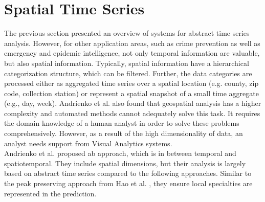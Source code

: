\documentclass[electronic]{vgtc}             %
\begin{document}
\section{Spatial Time Series\label{sec:spatiotemp}}
The previous section presented an overview of systems for abstract time series analysis. 
However, for other application areas, such as crime prevention as well as emergency and epidemic intelligence, not only temporal information are valuable, but also spatial information.
Typically, spatial information have a hierarchical categorization structure, which can be filtered.
Further, the data categories are processed either as aggregated time series over a spatial location (e.g. county, zip code, collection station) or represent a spatial snapshot of a small time aggregate (e.g., day, week).
Andrienko et al. \cite{Andrienko:2008, Andrienko:2010:Space} also found that geospatial analysis has a higher complexity and automated methods cannot adequately solve this task. 
It requires the domain knowledge of a human analyst in order to solve these problems comprehensively.
However, as a result of the high dimensionality of data, an analyst needs support from Visual Analytics systems.\\

Andrienko et al. \cite{Andrienko:2010} proposed ab approach, which is in between temporal and spatiotemporal. 
They include spatial dimensions, but their analysis is largely based on abstract time series compared to the following approaches.
Similar to the peak preserving approach from Hao et al. \cite{Hao:2009,Hao:2011,Hao:2012}, they ensure local specialties are represented in the prediction. 
\end{document}
